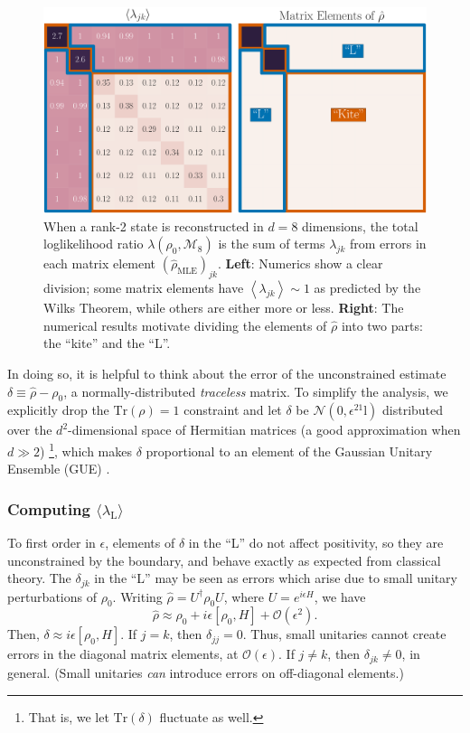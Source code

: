 \documentclass[aps,pra, twocolumn]{revtex4-1}
\newcommand{\Tr}{\mathrm{Tr}}
\newcommand{\Id}{\mathbb{I}}
\newcommand{\expect}[1]{\ensuremath{\left\langle#1\right\rangle}}
\def\Id{1\!\mathrm{l}}
\newcommand{\rhohat}{\hat{\rho}}
\newcommand{\rhoMLE}{\rhohat_{\scriptscriptstyle\mathrm{MLE}}}
\begin{document}
\begin{figure}[h]
\includegraphics[width=\columnwidth]{Images/Figure_2.pdf}
 \caption{When a rank-2 state is reconstructed in $d=8$ dimensions, the total loglikelihood ratio $\lambda(\rho_0,\mathcal{M}_8)$ is the sum of terms $\lambda_{jk}$ from errors in each matrix element $(\rhoMLE)_{jk}$.  \textbf{Left}:  Numerics show a clear division; some matrix elements have $\expect{\lambda_{jk}}\sim1$ as predicted by the Wilks Theorem, while others are either more or less. \textbf{Right}:  The numerical results motivate dividing the elements of $\rhohat$ into two parts: the ``kite'' and the ``L''.}
\label{fig:L}
\end{figure}

In doing so, it is helpful to think about the error of the unconstrained estimate $\delta \equiv \hat\rho- \rho_{0}$, a normally-distributed \emph{traceless} matrix.  To simplify the analysis, we explicitly drop the $\Tr(\rho)=1$ constraint and let $\delta$ be $\mathcal{N}(0,\epsilon^2\Id)$ distributed over the $d^2$-dimensional space of Hermitian matrices (a good approximation when $d\gg2$) \footnote{That is, we let $\mathrm{Tr}(\delta)$ fluctuate as well.}, which makes $\delta$ proportional to an element of the Gaussian Unitary Ensemble (GUE) \cite{Fyodorov2005}.

\subsubsection{Computing $\langle \lambda_\mathrm{L}\rangle$}

To first order in $\epsilon$, elements of $\delta$ in the ``L'' do not affect positivity, so they are unconstrained by the boundary, and behave exactly as expected from classical theory. The $\delta_{jk}$ in the ``L'' may be seen as errors which arise due to small unitary perturbations of $\rho_{0}$. Writing $\rhohat = U^{\dagger}\rho_{0}U$, where $U=e^{i\epsilon H}$, we have
\[\rhohat \approx \rho_{0} + i\epsilon [\rho_{0},H]+\mathcal{O}(\epsilon^{2}).\]
Then, $\delta \approx i\epsilon [\rho_{0},H]$.
If $j = k$, then $\delta_{jj} = 0$. Thus, small unitaries cannot create errors in the diagonal matrix elements, at $\mathcal{O}(\epsilon)$. If $j \neq k$, then $\delta_{jk} \neq 0$, in general. (Small unitaries \emph{can} introduce errors on off-diagonal elements.)
\end{document}
